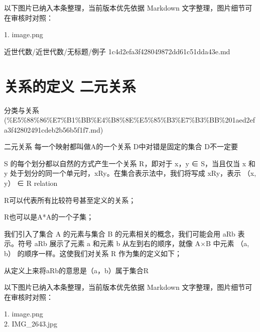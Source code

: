 \begin{note}[关联图片]
以下图片已纳入本条整理，当前版本优先依据 Markdown 文字整理，图片细节可在审核时对照：

1. image.png\\

\end{note}

\begin{note}[来源路径]

近世代数/近世代数/无标题/例子 1c4d2efa3f428049872dd61c51dda43e.md

\end{note}

\section*{关系的定义 二元关系}

\begin{note}[来源上级主题]

分类与关系 (\%E5\%88\%86\%E7\%B1\%BB\%E4\%B8\%8E\%E5\%85\%B3\%E7\%B3\%BB\%201aed2efa3f42802491cdeb2b56b5f1f7.md)

\end{note}

\begin{definition}

二元关系 每一个映射都叫做A的一个关系 D中对错是固定的集合 D不一定要

S 的每个划分都以自然的方式产生一个关系 R，即对于 x，y ∈ S，当且仅当 x 和 y 处于划分的同一个单元时，xRy。在集合表示法中，我们将写成 xRy，表示 （x, y） ∈ R      relation

R可以代表所有比较符号甚至定义的关系；

R也可以是A*A的一个子集；

我们引入了集合 A 的元素与集合 B 的元素相关的概念，我们可能会用 aRb 表示。符号 aRb 展示了元素 a 和元素 b 从左到右的顺序，就像 A×B 中元素 （a, b） 的顺序一样。这使我们对关系 R 作为集的定义如下；

从定义上来将aRb的意思是（a，b）属于集合R

\end{definition}

\begin{note}[关联图片]
以下图片已纳入本条整理，当前版本优先依据 Markdown 文字整理，图片细节可在审核时对照：

1. image.png\\
2. IMG\_2643.jpg\\

\end{note}

